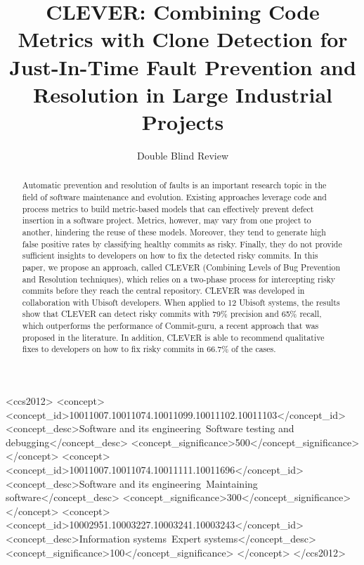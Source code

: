 \documentclass[sigconf]{acmart}
\begin{document}
\title{CLEVER: Combining Code Metrics with Clone Detection for Just-In-Time
Fault Prevention and Resolution in Large Industrial Projects}

\author{Double Blind Review}
\affiliation{%
  \institution{}
 \streetaddress{}
  \city{} 
  \state{} 
  \postcode{}
}
\email{}


\renewcommand{\shorttitle}{Combining Code Metrics With Clone Detection For Faults Prevention and Resolution}



\begin{abstract}
Automatic prevention and resolution of faults is an important research
topic in the field of software maintenance and evolution. Existing
approaches leverage code and process metrics to build metric-based
models that can effectively prevent defect insertion in a software
project. Metrics, however, may vary from one project to another,
hindering the reuse of these models. Moreover, they tend to generate
high false positive rates by classifying healthy commits as risky.
Finally, they do not provide sufficient insights to developers on how to
fix the detected risky commits. In this paper, we propose an approach,
called CLEVER (Combining Levels of Bug Prevention and Resolution
techniques), which relies on a two-phase process for intercepting risky
commits before they reach the central repository. CLEVER was developed
in collaboration with Ubisoft developers. When applied to 12 Ubisoft
systems, the results show that CLEVER can detect risky commits with 79\%
precision and 65\% recall, which outperforms the performance of
Commit-guru, a recent approach that was proposed in the literature. In
addition, CLEVER is able to recommend qualitative fixes to developers on
how to fix risky commits in 66.7\% of the cases.
\end{abstract}

%
%
\begin{CCSXML}
<ccs2012>
<concept>
<concept_id>10011007.10011074.10011099.10011102.10011103</concept_id>
<concept_desc>Software and its engineering~Software testing and debugging</concept_desc>
<concept_significance>500</concept_significance>
</concept>
<concept>
<concept_id>10011007.10011074.10011111.10011696</concept_id>
<concept_desc>Software and its engineering~Maintaining software</concept_desc>
<concept_significance>300</concept_significance>
</concept>
<concept>
<concept_id>10002951.10003227.10003241.10003243</concept_id>
<concept_desc>Information systems~Expert systems</concept_desc>
<concept_significance>100</concept_significance>
</concept>
</ccs2012>
\end{CCSXML}
\end{document}

